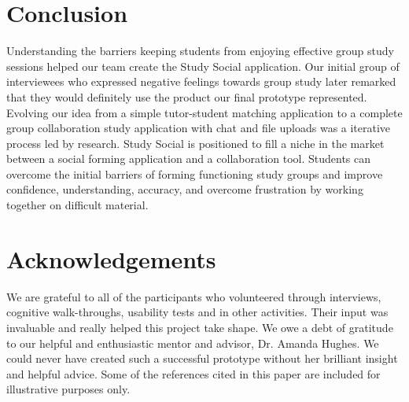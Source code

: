 \documentclass{sigchi-ext}
\begin{document}
\section{Conclusion}

Understanding the barriers keeping students from enjoying effective group study
sessions helped our team create the Study Social application. Our initial group of
interviewees who expressed negative feelings towards group study later remarked
that they would definitely use the product our final prototype represented.
Evolving our idea from a simple tutor-student matching application to a
complete group collaboration study application with chat and file uploads was a
iterative process led by research.  Study Social is positioned to fill a niche
in the market between a social forming application and a collaboration tool.
Students can overcome the initial barriers of forming functioning study groups
and improve confidence, understanding, accuracy, and overcome frustration by
working together on difficult material.        


\section{Acknowledgements}

We are grateful to all of the participants who
volunteered through interviews, cognitive walk-throughs, usability tests and in
other activities. Their input was invaluable and really helped this project
take shape.  We owe a debt of gratitude to our helpful and enthusiastic mentor
and advisor, Dr. Amanda Hughes. We could never have created such a successful
prototype without her brilliant insight and helpful advice.  Some of the
references cited in this paper are included for illustrative purposes only.



\balance{}

% 

% 

\end{document}
